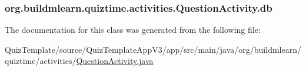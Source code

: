 \subsubsection[{\texorpdfstring{db}{db}}]{ org.\+buildmlearn.\+quiztime.\+activities.\+Question\+Activity.\+db\hspace{0.3cm}{\ttfamily [private]}}\hypertarget{classorg_1_1buildmlearn_1_1quiztime_1_1activities_1_1QuestionActivity_abe4c67792ea59f20f42050a5a77c8edf}{}\label{classorg_1_1buildmlearn_1_1quiztime_1_1activities_1_1QuestionActivity_abe4c67792ea59f20f42050a5a77c8edf}


The documentation for this class was generated from the following file\+:\begin{DoxyCompactItemize}
\item 
Quiz\+Template/source/\+Quiz\+Template\+App\+V3/app/src/main/java/org/buildmlearn/quiztime/activities/\hyperlink{QuizTemplate_2source_2QuizTemplateAppV3_2app_2src_2main_2java_2org_2buildmlearn_2quiztime_2activities_2QuestionActivity_8java}{Question\+Activity.\+java}\end{DoxyCompactItemize}

